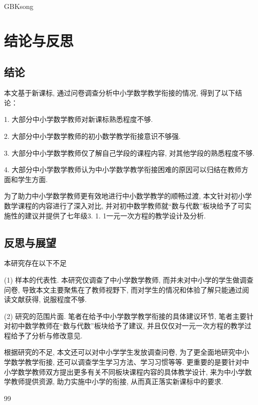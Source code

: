 \documentclass[a4paper,12pt,twoside]{ctexart}
\begin{document}
\begin{CJK*}{GBK}{song}
\section{结论与反思}
\subsection{结论}
本文基于新课标, 通过问卷调查分析中小学数学教学衔接的情况, 得到了以下结论：

1.	大部分中小学数学教师对新课标熟悉程度不够.

2.	大部分中小学数学教师的初小数学教学衔接意识不够强.

3.	大部分中小学数学教师仅了解自己学段的课程内容, 对其他学段的熟悉程度不够.

4.	大部分中小学数学教师认为中小学数学教学衔接困难的原因可以归结在教师方面和学生方面.

为了助力中小学数学教师更有效地进行中小数学教学的顺畅过渡, 本文针对初小学数学课程的内容进行了深入对比, 并对初中数学教师就“数与代数”板块给予了可实施性的建议并提供了七年级3. 1. 1一元一次方程的教学设计及分析.

\subsection{反思与展望}
本研究存在以下不足

 (1) 	样本的代表性. 本研究仅调查了中小学数学教师, 而并未对中小学的学生做调查问卷, 导致本文主要聚焦在了教师视野下, 而对学生的情况和体验了解只能通过阅读文献获得, 说服程度不够.

 (2)    研究的范围片面. 笔者在给予中小学数学教学衔接的具体建议环节, 笔者主要针对初中数学教师在“数与代数”板块给予了建议,  并且仅仅对一元一次方程的教学过程给予了分析与修改意见.

根据研究的不足, 本文还可以对中小学学生发放调查问卷, 为了更全面地研究中小学数学教学衔接, 还可以调查学生学习方法、学习习惯等等. 更重要的是要针对中小学数学教师双方提出更多有关不同板块课程内容的具体教学设计, 来为中小学数学教师提供资源, 助力实施中小学的衔接, 从而真正落实新课标中的要求.




%
%
%
%
%
%
%
\newpage
\begin{thebibliography}{99}\bigskip
{}
\setlength{\itemsep}{-0.75ex}


\end{thebibliography}
\end{CJK*}
\end{document}
